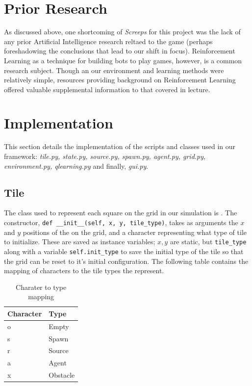 \documentclass[11pt]{article}
\begin{document}
\section{Prior Research}

As discussed above, one shortcoming of \textit{Screeps} for this project was the lack of any prior Artificial Intelligence research reltaed to the game (perhaps foreshadowing the conclusions that lead to our shift in focus). Reinforcement Learning as a technique for building bots to play games, however, is a common research subject. Though an our environment and learning methods were relatively simple, resources providing background on Reinforcement Learning offered valuable supplemental information to that covered in lecture.

\section{Implementation}

This section details the implementation of the scripts and classes used in our framework: \textit{tile.py, state.py, source.py, spawn.py, agent.py, grid.py, environment.py, qlearning.py} and finally, \textit{gui.py}.

\subsection{Tile}

The class used to represent each square on the grid in our simulation is . The constructor, \texttt{def __init__(self, x, y, tile_type)}, takes as arguments the $x$ and $y$ positions of the  on the grid, and a character representing what type of tile to initialize. These are saved as instance variables; $x, y$ are static, but \texttt{tile_type} along with a variable \texttt{self.init_type} to save the initial type of the tile so that the grid can be reset to it's initial configuration. The following table contains the mapping of characters to the tile types the represent.

\begin{table}[h]
\centering
\caption{Charater to type mapping}
\begin{tabular}{|l|l|}
\hline
Character & Type \\ \hline
o & Empty \\ \hline
s & Spawn \\ \hline
r & Source \\ \hline
a & Agent \\ \hline
x & Obstacle \\ \hline
\end{tabular}
\end{table}
\end{document}
